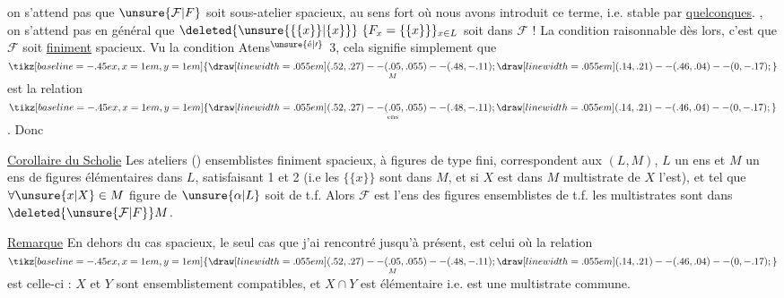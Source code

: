 on s'attend pas  que $\unsure{\mathcal F|F}$ soit  sous-atelier
spacieux, au sens  fort où nous
avons introduit ce terme, i.e. stable par
 \uline{quelconques}. ,  on s'attend
pas en général que $\deleted{\unsure{\{\{x\}\}|\{x\}}}\ \{F_x=\{\{x\}\}\}_{x\in L}$
soit dans $\mathcal F$ ! La condition raisonnable
dès lors, c'est que $\mathcal F$ soit \uline{finiment}
spacieux. Vu la condition Atens${}^{\unsure{\text{é}|\prime}}$ 3,
cela signifie simplement  que
  $\underset{M}{\mathrel{\tikz[baseline=-.45ex,x=1em,y=1em]{\draw[line width=.055em] (.52,.27)--(.05,.055)--(.48,-.11); \draw[line width=.055em] (.14,.21)--(.46,.04)--(0,-.17);}}}$ est la relation
$\underset{\mathrm{ens}}{\mathrel{\tikz[baseline=-.45ex,x=1em,y=1em]{\draw[line width=.055em] (.52,.27)--(.05,.055)--(.48,-.11); \draw[line width=.055em] (.14,.21)--(.46,.04)--(0,-.17);}}}$ . Donc

\uline{Corollaire du Scholie} Les ateliers ()
ensemblistes finiment spacieux,
à figures de type fini, correspondent
aux $(L,M)$, $L$ un ens et $M$
un ens de figures élémentaires dans $L$,
satisfaisant \uline{} 1 et \uline{} 2
(i.e les $\{\{x\}\}$ sont dans $M$, et si $X$ est
dans $M$  multistrate de $X$ l'est),
et tel que $\forall \unsure{x|X}\in M$   figure
de $\unsure{\alpha|L}$ soit de t.f. Alors $\mathcal F$ est l'ens des
figures ensemblistes de t.f. 
les multistrates sont dans $\deleted{\unsure{\mathcal F|F}}M$.

\uline{Remarque} En dehors du cas  spacieux, le
seul  cas  que j'ai rencontré
jusqu'à présent, est celui où la
relation $\underset{M}{\mathrel{\tikz[baseline=-.45ex,x=1em,y=1em]{\draw[line width=.055em] (.52,.27)--(.05,.055)--(.48,-.11); \draw[line width=.055em] (.14,.21)--(.46,.04)--(0,-.17);}}}$ est celle-ci : $X$ et $Y$
sont ensemblistement compatibles, et
$X\cap Y$ est   élémentaire i.e.
est une multistrate commune.

